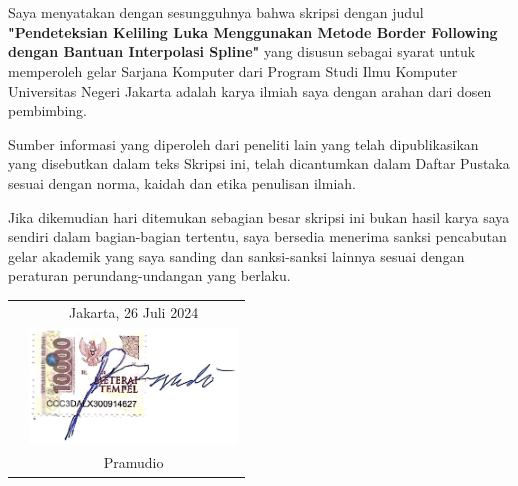 \chapter*{}
\onehalfspacing{}

Saya menyatakan dengan sesungguhnya bahwa skripsi dengan judul
\textbf{"Pendeteksian Keliling Luka Menggunakan Metode 
Border Following dengan Bantuan Interpolasi Spline"} yang disusun sebagai syarat untuk memperoleh gelar Sarjana Komputer
dari Program Studi Ilmu Komputer Universitas Negeri Jakarta adalah karya ilmiah
saya dengan arahan dari dosen pembimbing.

Sumber informasi yang diperoleh dari peneliti lain yang telah dipublikasikan 
yang disebutkan dalam teks Skripsi ini, telah dicantumkan dalam Daftar Pustaka 
sesuai dengan norma, kaidah dan etika penulisan ilmiah.

Jika dikemudian hari ditemukan sebagian besar skripsi ini bukan hasil karya saya 
sendiri dalam bagian-bagian tertentu, saya bersedia menerima sanksi pencabutan 
gelar akademik yang saya sanding dan sanksi-sanksi lainnya sesuai dengan 
peraturan perundang-undangan yang berlaku.

\vspace{4cm}

\begin{tabular}{p{7.5cm}c}
	&Jakarta, 26 Juli 2024\\
	&\includegraphics[keepaspectratio, width=5.533864542cm]
	{gambar/TTD_Pramudio_with_Materai.png}\\
	&Pramudio
\end{tabular}